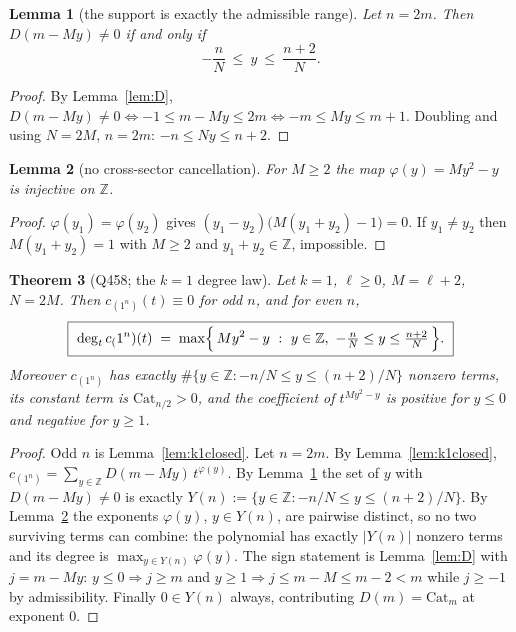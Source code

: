 \documentclass[11pt]{article}
\theoremstyle{plain}
\newtheorem{theorem}{Theorem}[section]
\newtheorem{lemma}[theorem]{Lemma}
\theoremstyle{definition}
\theoremstyle{remark}
\newcommand{\Z}{\mathbb{Z}}
\newcommand{\onen}{(1^{n})}
\begin{document}
\begin{lemma}[the support is exactly the admissible range]\label{lem:exact}
Let $n=2m$. Then $D(m-My)\ne0$ if and only if
\[
  -\frac{n}{N}\ \le\ y\ \le\ \frac{n+2}{N}.
\]
\end{lemma}

\begin{proof}
By Lemma~\ref{lem:D}, $D(m-My)\ne0\iff -1\le m-My\le 2m\iff -m\le My\le m+1$.
Doubling and using $N=2M$, $n=2m$: $-n\le Ny\le n+2$.
\end{proof}

\begin{lemma}[no cross-sector cancellation]\label{lem:inj}
For $M\ge2$ the map $\varphi(y)=My^2-y$ is injective on $\Z$.
\end{lemma}

\begin{proof}
$\varphi(y_1)=\varphi(y_2)$ gives $(y_1-y_2)\bigl(M(y_1+y_2)-1\bigr)=0$. If $y_1\ne y_2$
then $M(y_1+y_2)=1$ with $M\ge2$ and $y_1+y_2\in\Z$, impossible.
\end{proof}

\begin{theorem}[Q458; the $k=1$ degree law]\label{thm:k1}
Let $k=1$, $\ell\ge0$, $M=\ell+2$, $N=2M$. Then $c_\onen(t)\equiv0$ for odd $n$, and for
even $n$,
\[
  \boxed{\ \deg_t c_\onen(t)\;=\;\max\Bigl\{\,My^2-y\ :\ y\in\Z,\ -\tfrac{n}{N}\le y\le\tfrac{n+2}{N}\,\Bigr\}.\ }
\]
Moreover $c_\onen$ has exactly $\#\{y\in\Z: -n/N\le y\le(n+2)/N\}$ nonzero terms, its
constant term is $\mathrm{Cat}_{n/2}>0$, and the coefficient of $t^{My^2-y}$ is positive
for $y\le0$ and negative for $y\ge1$.
\end{theorem}

\begin{proof}
Odd $n$ is Lemma~\ref{lem:k1closed}. Let $n=2m$. By Lemma~\ref{lem:k1closed},
$c_\onen=\sum_{y\in\Z}D(m-My)\,t^{\varphi(y)}$. By Lemma~\ref{lem:exact} the set of $y$
with $D(m-My)\ne0$ is exactly $Y(n):=\{y\in\Z:-n/N\le y\le(n+2)/N\}$. By
Lemma~\ref{lem:inj} the exponents $\varphi(y)$, $y\in Y(n)$, are pairwise distinct, so no
two surviving terms can combine: the polynomial has exactly $|Y(n)|$ nonzero terms and its
degree is $\max_{y\in Y(n)}\varphi(y)$. The sign statement is Lemma~\ref{lem:D} with
$j=m-My$: $y\le0\Rightarrow j\ge m$ and $y\ge1\Rightarrow j\le m-M\le m-2<m$ while
$j\ge-1$ by admissibility. Finally $0\in Y(n)$ always, contributing $D(m)=\mathrm{Cat}_m$
at exponent $0$.
\end{proof}
\end{document}

